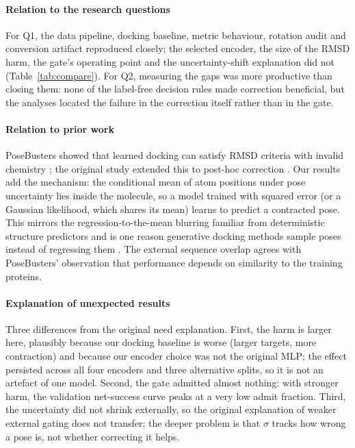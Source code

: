 \documentclass[preprint,12pt,authoryear]{elsarticle}
\begin{document}
\paragraph{Relation to the research questions} For Q1, the data pipeline, docking baseline, metric behaviour, rotation audit
and conversion artifact reproduced closely; the selected encoder, the size of the RMSD harm, the gate's operating point and
the uncertainty-shift explanation did not (Table~\ref{tab:compare}). For Q2, measuring the gaps was more productive than
closing them: none of the label-free decision rules made correction beneficial, but the analyses located the failure in the
correction itself rather than in the gate.

\paragraph{Relation to prior work} PoseBusters showed that learned docking can satisfy RMSD criteria with invalid chemistry
\citep{buttenschoen2024posebusters}; the original study extended this to post-hoc correction
\citep{mwamughunda2026original}. Our results add the mechanism: the conditional mean of atom positions under pose uncertainty
lies inside the molecule, so a model trained with squared error (or a Gaussian likelihood, which shares its mean) learns to
predict a contracted pose. This mirrors the regression-to-the-mean blurring familiar from deterministic structure predictors
and is one reason generative docking methods sample poses instead of regressing them \citep{corso2023diffdock}. The external
sequence overlap agrees with PoseBusters' observation that performance depends on similarity to the training proteins.

\paragraph{Explanation of unexpected results} Three differences from the original need explanation. First, the harm is larger
here, plausibly because our docking baseline is worse (larger targets, more contraction) and because our encoder choice was
not the original MLP; the effect persisted across all four encoders and three alternative splits, so it is not an artefact of
one model. Second, the gate admitted almost nothing: with stronger harm, the validation net-success curve peaks at a very low
admit fraction. Third, the uncertainty did not shrink externally, so the original explanation of weaker external gating does
not transfer; the deeper problem is that $\sigma$ tracks how wrong a pose is, not whether correcting it helps.
\end{document}
